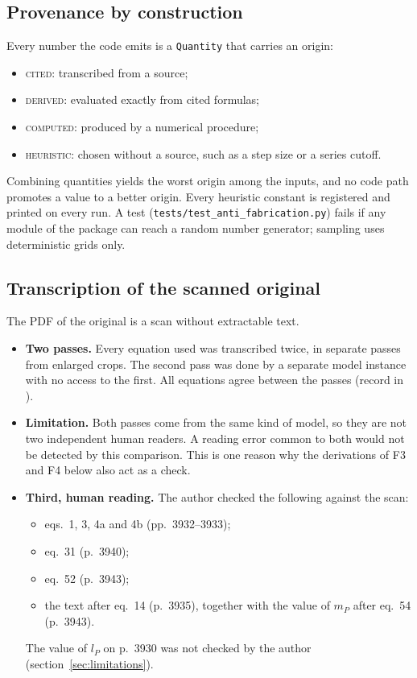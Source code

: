 \subsection{Provenance by construction}

Every number the code emits is a \texttt{Quantity} that carries an origin:
\begin{itemize}
\item \textsc{cited}: transcribed from a source;
\item \textsc{derived}: evaluated exactly from cited formulas;
\item \textsc{computed}: produced by a numerical procedure;
\item \textsc{heuristic}: chosen without a source, such as a step size or a series cutoff.
\end{itemize}
Combining quantities yields the worst origin among the inputs, and no code path promotes a value to a better origin. Every heuristic constant is registered and printed on every run. A test (\texttt{tests/test\_anti\_fabrication.py}) fails if any module of the package can reach a random number generator; sampling uses deterministic grids only.

\subsection{Transcription of the scanned original}
\label{sec:transcription}

The PDF of the original is a scan without extractable text.
\begin{itemize}
\item \textbf{Two passes.} Every equation used was transcribed twice, in separate passes from enlarged crops. The second pass was done by a separate model instance with no access to the first. All \TranscribedEquations{} equations agree between the passes (record in ).
\item \textbf{Limitation.} Both passes come from the same kind of model, so they are not two independent human readers. A reading error common to both would not be detected by this comparison. This is one reason why the derivations of F3 and F4 below also act as a check.
\item \textbf{Third, human reading.} The author checked the following against the scan:
  \begin{itemize}
  \item eqs.~1, 3, 4a and 4b (pp.~3932--3933);
  \item eq.~31 (p.~3940);
  \item eq.~52 (p.~3943);
  \item the text after eq.~14 (p.~3935), together with the value of $m_P$ after eq.~54 (p.~3943).
  \end{itemize}
  The value of $l_P$ on p.~3930 was not checked by the author (section~\ref{sec:limitations}).
\end{itemize}

